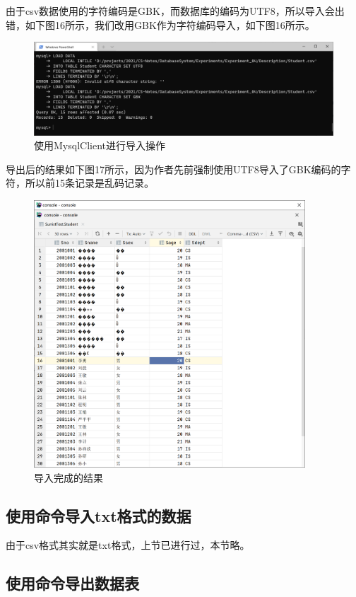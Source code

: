 \documentclass[a4paper,UTF8,heading=false,12pt]{article}
\begin{document}
由于csv数据使用的字符编码是GBK，而数据库的编码为UTF8，所以导入会出错，如下图16所示，我们改用GBK作为字符编码导入，如下图16所示。

\begin{figure}[htbp]
    \centering
    \includegraphics[width=15cm]{../Images/ImportWithCommand_OnLoad.png}
    \caption{使用MysqlClient进行导入操作}
\end{figure}

导出后的结果如下图17所示，因为作者先前强制使用UTF8导入了GBK编码的字符，所以前15条记录是乱码记录。

\begin{figure}[htbp]
    \centering
    \includegraphics[height=10cm]{../Images/ImportWithCommand_OnLoaded.png}
    \caption{导入完成的结果}
\end{figure}

\subsection{使用命令导入txt格式的数据}

由于csv格式其实就是txt格式，上节已进行过，本节略。

\subsection{使用命令导出数据表}
\end{document}
